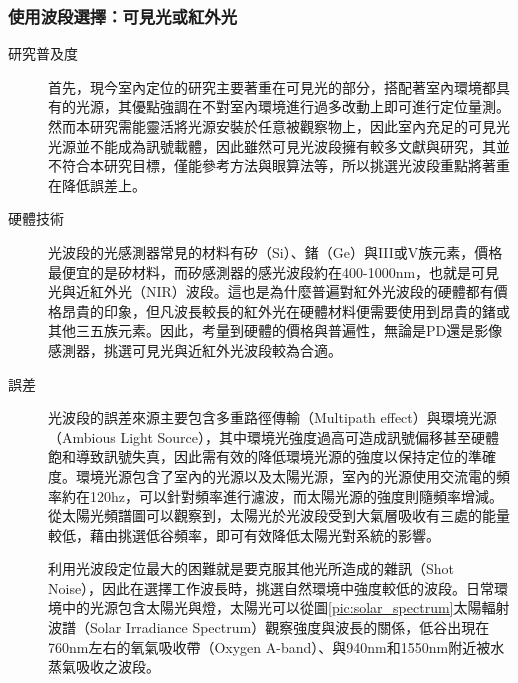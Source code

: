         \subsubsection{使用波段選擇：可見光或紅外光}

        \begin{description}
        \item[研究普及度]\hfill 

        首先，現今室內定位的研究主要著重在可見光的部分\cite{survey_light2018}，搭配著室內環境都具有的光源，其優點強調在不對室內環境進行過多改動上即可進行定位量測。然而本研究需能靈活將光源安裝於任意被觀察物上，因此室內充足的可見光光源並不能成為訊號載體，因此雖然可見光波段擁有較多文獻與研究，其並不符合本研究目標，僅能參考方法與眼算法等，所以挑選光波段重點將著重在降低誤差上。

        \item[硬體技術] \hfill 
        
        光波段的光感測器常見的材料有矽（Si）、鍺（Ge）與III或V族元素，價格最便宜的是矽材料，而矽感測器的感光波段約在400-1000nm，也就是可見光與近紅外光（NIR）波段。這也是為什麼普遍對紅外光波段的硬體都有價格昂貴的印象，但凡波長較長的紅外光在硬體材料便需要使用到昂貴的鍺或其他三五族元素\cite{si_pd}。因此，考量到硬體的價格與普遍性，無論是PD還是影像感測器，挑選可見光與近紅外光波段較為合適。


        \item[誤差] \hfill 
        

        光波段的誤差來源主要包含多重路徑傳輸（Multipath effect）與環境光源（Ambious Light Source）\cite{survey_light2020}，其中環境光強度過高可造成訊號偏移甚至硬體飽和導致訊號失真，因此需有效的降低環境光源的強度以保持定位的準確度。環境光源包含了室內的光源以及太陽光源，室內的光源使用交流電的頻率約在120hz，可以針對頻率進行濾波，而太陽光源的強度則隨頻率增減。從太陽光頻譜圖可以觀察到，太陽光於光波段受到大氣層吸收有三處的能量較低，藉由挑選低谷頻率，即可有效降低太陽光對系統的影響。

        利用光波段定位最大的困難就是要克服其他光所造成的雜訊（Shot Noise），因此在選擇工作波長時，挑選自然環境中強度較低的波段。日常環境中的光源包含太陽光與燈，太陽光可以從圖\ref{pic:solar_spectrum}太陽輻射波譜（Solar Irradiance Spectrum）觀察強度與波長的關係，低谷出現在760nm左右的氧氣吸收帶（Oxygen A-band）、與940nm和1550nm附近被水蒸氣吸收之波段\cite{book:solar_spectrum}。


\end{description}
